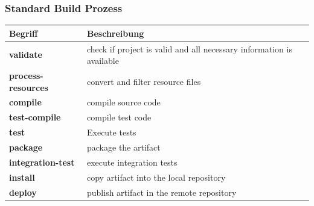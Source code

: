 \documentclass[10pt]{article}
\begin{document}
\subsubsection{Standard Build Prozess}
\begin{tabular}{|ll|c} 
\hline
Begriff & Beschreibung  \\
\hline
	\textbf{validate} & check if project is valid and all necessary information is available \\
	\textbf{process-resources} & convert and filter resource files \\
	\textbf{compile} & compile source code \\
	\textbf{test-compile} & compile test code \\
	\textbf{test} & Execute tests \\
	\textbf{package} & package the artifact \\
	\textbf{integration-test} & execute integration tests \\
	\textbf{install} & copy artifact into the local repository \\
	\textbf{deploy} & publish artifact in the remote repository \\
\hline
\end{tabular}
\end{document}

